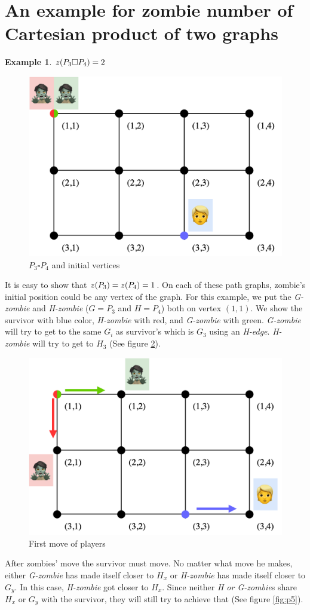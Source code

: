 \documentclass[1p]{elsarticle}
\newtheorem{example}[theorem]{Example}
\newcommand{\zn}{\ooalign{$z$\cr\hfil\rule[.5ex]{.2em}{.08ex}\hfil\cr}}
\begin{document}
\newpage
\appendix
\section{An example for zombie number of Cartesian product of two graphs} \label{CartesianProductExample}
\begin{example} $\zn(P_3 \square P_4 ) = 2$
\end{example}

\begin{figure}[h!]
	\centering
	\includegraphics[width=0.5\linewidth]{fig/p34m1.png}
	\caption{$P_3 \square P_4$ and initial vertices}
	\label{fig:p3}
\end{figure}

It is easy to show that $\zn(P_3) = \zn(P_4) = 1$. On each of these path graphs, zombie's initial position could be any
vertex of the graph. For this example, we put the {\it G-zombie} and {\it H-zombie} ($G = P_3$ and $H = P_4$) both on
vertex $(1,1)$. We show the survivor with blue color, {\it H-zombie} with red, and {\it G-zombie} with green. {\it
G-zombie} will try to get to the same $G_{i}$ as survivor's which is $G_3$ using an {\it H-edge}. {\it H-zombie} will
try to get to $H_3$ (See figure \ref{fig:p4}).

\begin{figure}[h!]
	\centering
	\includegraphics[width=0.5\linewidth]{fig/p34m2.png}
	\caption{First move of players}
	\label{fig:p4}
\end{figure}

After zombies' move the survivor must move. No matter what move he makes, either {\it G-zombie} has made itself closer
to $H_x$ or {\it H-zombie} has made itself closer to $G_y$. In this case, {\it H-zombie} got closer to $H_x$. Since
neither {\it H or G-zombie}s share $H_x$ or $G_y$ with the survivor, they will still try to achieve that (See figure \ref{fig:p5}).
\end{document}
